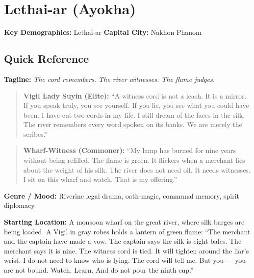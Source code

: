 \section{Lethai-ar (Ayokha)}
\label{chap:lethai-ar-ayokha-revised}

\textbf{Key Demographics: } Lethai-ar
\textbf{Capital City: } Nakhon Phanom

\subsection*{Quick Reference}
\textbf{Tagline:} \textit{The cord remembers. The river witnesses. The flame judges.}

\begin{quote}
  \textbf{Vigil Lady Suyin (Elite):}  
  ``A witness cord is not a leash. It is a mirror. If you speak truly, you see yourself. If you lie, you see what you could have been. I have cut two cords in my life. I still dream of the faces in the silk. The river remembers every word spoken on its banks. We are merely the scribes.''
\end{quote}

\begin{quote}
  \textbf{Wharf-Witness (Commoner):}  
  ``My lamp has burned for nine years without being refilled. The flame is green. It flickers when a merchant lies about the weight of his silk. The river does not need oil. It needs witnesses. I sit on this wharf and watch. That is my offering.''
\end{quote}

\textbf{Genre / Mood:} Riverine legal drama, oath-magic, communal memory, spirit diplomacy.

\textbf{Starting Location:} A monsoon wharf on the great river, where silk barges are being loaded. A Vigil in gray robes holds a lantern of green flame: ``The merchant and the captain have made a vow. The captain says the silk is eight bales. The merchant says it is nine. The witness cord is tied. It will tighten around the liar's wrist. I do not need to know who is lying. The cord will tell me. But you --- you are not bound. Watch. Learn. And do not pour the ninth cup.''

